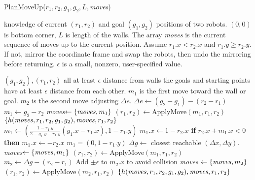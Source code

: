 \begin{algorithm}
\caption{{\sc PlanMoveUp}($r_1,r_2,g_1,g_2,L, $\emph{moves})}\label{alg:Wallup}
\begin{algorithmic}[1]
\Require knowledge of current $(r_1,r_2)$ and goal $(g_1,g_2)$ positions of  two robots. 
$(0,0)$ is bottom corner,
 $L$ is length of the walls. 
 The array \emph{moves} is the current sequence of moves up to the current position.
 Assume $r_1.x < r_2.x$ and $r_1.y \geq r_2.y$. If not, mirror the coordinate frame and swap the robots, then undo the mirroring before returning.
 $\epsilon $ is a small, nonzero, user-specified value.
 
\Ensure $(g_1, g_2) , (r_1, r_2)$ all at least $\epsilon$ distance from walls the goals and starting points have at least $\epsilon$ distance from each other.  
$m_1$ is the first move toward the wall or goal.
 $m_2$ is the second move adjusting $\Delta e$.
\State $\Delta e \gets (g_2 - g_1)- (r_2- r_1)$
 
\State $m_1  \gets g_2 -  r_2$
\State \emph{moves}$ \gets \{ \text{\emph{moves}},   m_1 \}$
\State $(r_1,r_2) \gets ${\sc ApplyMove}$(m_1,r_1,r_2)$
\State \Return $\{h(\text{\emph{moves}}, r_1,r_2,g_1,g_2), \text{\emph{moves}},r_1,r_2\}$
\EndIf
{} 
\State $m_1 \gets \left(\frac{1-r_1.y}{2-g_1.y-r_1.y} (g_1.x -r_1.x), 1-r_1.y \right)$
\State $m_1.x \gets 1- r_2.x$
\Else \textbf{ if} {$r_2.x + m_1.x < 0$}  \textbf{then}
\State $m_1.x \gets -r_2.x$
\EndIf
\Else 
\State $m_1 = (0, 1-r_1.y)$
\State $\Delta g \gets $ closest reachable $(\Delta x,\Delta y)$.
\EndIf
\State \emph{moves}$ \gets \{ \text{\emph{moves}},   m_1\}$
\State $(r_1,r_2) \gets ${\sc ApplyMove}$(m_1,r_1,r_2)$
\State $m_2 \gets \Delta g -  (r_2- r_1)$
\State Add $\pm \epsilon$ to $m_2.x$ to avoid collision
\EndIf
\State \emph{moves} $ \gets \{ \text{\emph{moves}},   m_2\}$
\State $(r_1,r_2) \gets ${\sc ApplyMove}$(m_2,r_1,r_2)$
\State \Return $\{h(\text{\emph{moves}}, r_1,r_2,g_1,g_2), \text{\emph{moves}},r_1,r_2\}$
\end{algorithmic}
\end{algorithm}








